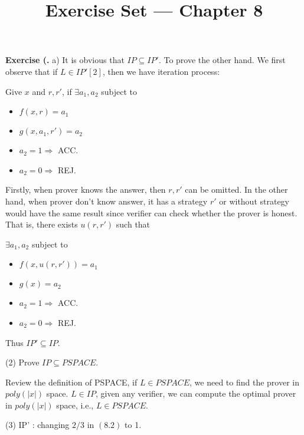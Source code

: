 \documentclass[a4paper]{article}
\title{Exercise Set --- Chapter 8}
\date{}
\newenvironment{exercise}[1]{
	\par
	\noindent\textbf{Exercise #1.}\quad
}{
	\par
	\bigskip
}
\begin{document}
    \maketitle

	\begin{exercise}{8.1}
	(a) It is obvious that $IP\subseteq IP'$. To prove the other hand. We first observe that if $L \in IP'[2]$, then we have iteration process:

	Give $x$ and $r,r'$, if $\exists a_{1}, a_{2}$ subject to
	\begin{itemize}
	\item $f(x, r) = a_{1}$
	\item $g(x, a_{1}, r') = a_{2}$
	\item $a_{2} = 1\Rightarrow $ ACC.
	\item $a_{2} = 0 \Rightarrow $ REJ.
	\end{itemize}

	Firstly, when prover knows the answer, then $r, r'$ can be omitted. In the other hand, when prover don't know answer, it has a strategy $r'$ or without strategy would have the same result since verifier can check whether the prover is honest. That is, there exists $u(r, r')$ such that

	$\exists a_{1}, a_{2}$ subject to
	\begin{itemize}
	\item $f(x, u(r,r')) = a_{1}$
	\item $g(x) = a_{2}$
	\item $a_{2} = 1\Rightarrow $ ACC.
	\item $a_{2} = 0 \Rightarrow $ REJ.
	\end{itemize}
	  Thus $IP'\subseteq IP$.

	(2) Prove $IP\subseteq PSPACE$.

	Review the definition of PSPACE, if $L\in PSPACE$, we need to find the prover in $poly(|x|)$ space. $L\in IP$, given any verifier, we can compute the optimal prover in $poly(|x|)$ space, i.e., $L\in PSPACE$.

	(3) IP' : changing $2/3$ in $(8.2)$ to 1.


\end{exercise}
\end{document}
